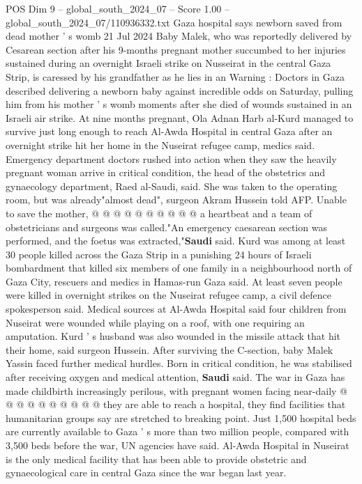 \begin{textsample}{POS Dim 9 – global\_south\_2024\_07 – Score 1.00 – global\_south\_2024\_07/110936332.txt}  \label{ex:f9_pos_113}
Gaza hospital says newborn saved from dead mother ' s womb 21 Jul 2024 Baby Malek, who was reportedly delivered by Cesarean section after his 9-months pregnant mother succumbed to her injuries sustained during an overnight Israeli strike on Nusseirat in the central Gaza Strip, is caressed by his grandfather as he lies in an Warning : Doctors in Gaza described delivering a newborn baby against incredible odds on Saturday, pulling him from his mother ' s womb moments after she died of wounds sustained in an Israeli air strike.
At nine months pregnant, Ola Adnan Harb al-Kurd managed to survive just long enough to reach Al-Awda Hospital in central Gaza after an overnight strike hit her home in the Nuseirat refugee camp, medics said.
Emergency department doctors rushed into action when they saw the heavily pregnant woman arrive in critical condition, the head of the obstetrics and gynaecology department, Raed al-Saudi, said.
She was taken to the operating room, but was already"almost dead", surgeon Akram Hussein told AFP.
Unable to save the mother, @ @ @ @ @ @ @ @ @ @ a heartbeat and a team of obstetricians and surgeons was called."An emergency caesarean section was performed, and the foetus was extracted,"\textbf{Saudi} said.
Kurd was among at least 30 people killed across the Gaza Strip in a punishing 24 hours of Israeli bombardment that killed six members of one family in a neighbourhood north of Gaza City, rescuers and medics in Hamas-run Gaza said.
At least seven people were killed in overnight strikes on the Nuseirat refugee camp, a civil defence spokesperson said.
Medical sources at Al-Awda Hospital said four children from Nuseirat were wounded while playing on a roof, with one requiring an amputation.
Kurd ' s husband was also wounded in the missile attack that hit their home, said surgeon Hussein.
After surviving the C-section, baby Malek Yassin faced further medical hurdles.
Born in critical condition, he was stabilised after receiving oxygen and medical attention, \textbf{Saudi} said.
The war in Gaza has made childbirth increasingly perilous, with pregnant women facing near-daily @ @ @ @ @ @ @ @ @ @ they are able to reach a hospital, they find facilities that humanitarian groups say are stretched to breaking point.
Just 1,500 hospital beds are currently available to Gaza ' s more than two million people, compared with 3,500 beds before the war, UN agencies have said.
Al-Awda Hospital in Nuseirat is the only medical facility that has been able to provide obstetric and gynaecological care in central Gaza since the war began last year.

\end{textsample}

